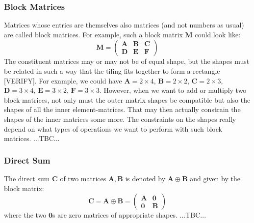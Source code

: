 \subsubsection{Block Matrices}
Matrices whose entries are themselves also matrices (and not numbers as usual) are called block matrices. For example, such a block matrix $\mathbf{M}$ could look like:
\begin{equation}
\mathbf{M} = 
\begin{pmatrix}
\mathbf{A} & \mathbf{B} & \mathbf{C} \\
\mathbf{D} & \mathbf{E} & \mathbf{F} 
\end{pmatrix}
\end{equation}
The constituent matrices may or may not be of equal shape, but the shapes must be related in such a way that the tiling fits together to form a rectangle [VERIFY]. For example, we could have $\mathbf{A} = 2 \times 4$,  $\mathbf{B} = 2 \times 2$, $\mathbf{C} = 2 \times 3$, $\mathbf{D} = 3 \times 4$, $\mathbf{E} = 3 \times 2$, $\mathbf{F} = 3 \times 3$. However, when we want to add or multiply two block matrices, not only must the outer matrix shapes be compatible but also the shapes of all the inner element-matrices. That may then actually constrain the shapes of the inner matrices some more. The constraints on the shapes really depend on what types of operations we want to perform with such block matrices. ...TBC...




\subsubsection{Direct Sum} 
The direct sum $\mathbf{C}$ of two matrices $\mathbf{A},\mathbf{B}$ is denoted by $ \mathbf{A} \oplus \mathbf{B}$ and given by the block matrix:
\begin{equation}
\mathbf{C} = \mathbf{A} \oplus \mathbf{B} = 
\begin{pmatrix} 
\mathbf{A} & \mathbf{0} \\
\mathbf{0} & \mathbf{B}
\end{pmatrix} 
\end{equation}
where the two $\mathbf{0}$s are zero matrices of appropriate shapes. ...TBC...


